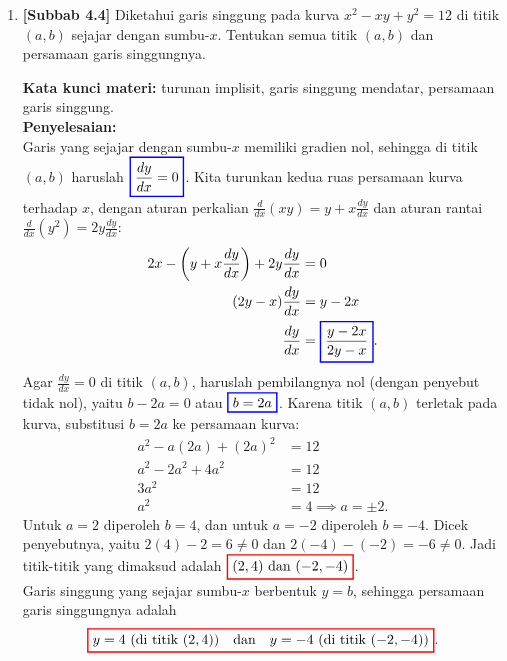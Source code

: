 \documentclass[10pt,openany,a4paper]{article}
\theoremstyle{definition}
\theoremstyle{definition}
\theoremstyle{plain}
\newenvironment{jawab}[2][tes]{%
\par\noindent\textbf{Kata kunci materi:} #1.\\
\textbf{Penyelesaian:} #2%
}{}
\begin{document}
\begin{enumerate}
    \item \textbf{[Subbab 4.4]} Diketahui garis singgung pada kurva $x^2-xy+y^2=12$ di titik $(a,b)$ sejajar dengan sumbu-$x$. Tentukan semua titik $(a,b)$ dan persamaan garis singgungnya.
    \begin{jawab}[turunan implisit, garis singgung mendatar, persamaan garis singgung]{~\\
        Garis yang sejajar dengan sumbu-$x$ memiliki gradien nol, sehingga di titik $(a,b)$ haruslah $\colorlet{oldcolor}{.}
        \color{blue}
        \setlength{\fboxrule}{1pt} \boxed{\color{oldcolor}\frac{dy}{dx}=0}\color{oldcolor}$. Kita turunkan kedua ruas persamaan kurva terhadap $x$, dengan aturan perkalian $\frac{d}{dx}(xy)=y+x\frac{dy}{dx}$ dan aturan rantai $\frac{d}{dx}(y^2)=2y\frac{dy}{dx}$:
        \begin{align*}
            2x - \left(y + x\frac{dy}{dx}\right) + 2y\frac{dy}{dx} &= 0\\
            (2y - x)\frac{dy}{dx} &= y - 2x\\
            \frac{dy}{dx} &= \colorlet{oldcolor}{.}
        \color{blue}
        \setlength{\fboxrule}{1pt} \boxed{\color{oldcolor}\frac{y-2x}{2y-x}}\color{oldcolor}.
        \end{align*}
        Agar $\frac{dy}{dx}=0$ di titik $(a,b)$, haruslah pembilangnya nol (dengan penyebut tidak nol), yaitu $b-2a=0$ atau $\colorlet{oldcolor}{.}
        \color{blue}
        \setlength{\fboxrule}{1pt} \boxed{\color{oldcolor}b=2a}\color{oldcolor}$. Karena titik $(a,b)$ terletak pada kurva, substitusi $b=2a$ ke persamaan kurva:
        \begin{align*}
            a^2 - a(2a) + (2a)^2 &= 12\\
            a^2 - 2a^2 + 4a^2 &= 12\\
            3a^2 &= 12\\
            a^2 &= 4 \implies a=\pm 2.
        \end{align*}
        Untuk $a=2$ diperoleh $b=4$, dan untuk $a=-2$ diperoleh $b=-4$. Dicek penyebutnya, yaitu $2(4)-2=6\neq 0$ dan $2(-4)-(-2)=-6\neq 0$. Jadi titik-titik yang dimaksud adalah $\colorlet{oldcolor}{.}
        \color{red}
        \setlength{\fboxrule}{1pt} \boxed{\color{oldcolor}(2,4) \text{ dan } (-2,-4)}\color{oldcolor}$.\\
        Garis singgung yang sejajar sumbu-$x$ berbentuk $y=b$, sehingga persamaan garis singgungnya adalah
        \begin{align*}
            \colorlet{oldcolor}{.}
        \color{red}
        \setlength{\fboxrule}{1pt} \boxed{\color{oldcolor}y=4 \text{ (di titik } (2,4)) \quad\text{dan}\quad y=-4 \text{ (di titik } (-2,-4))}\color{oldcolor}.
        \end{align*}
    }
    \end{jawab}
\end{enumerate}
\end{document}
